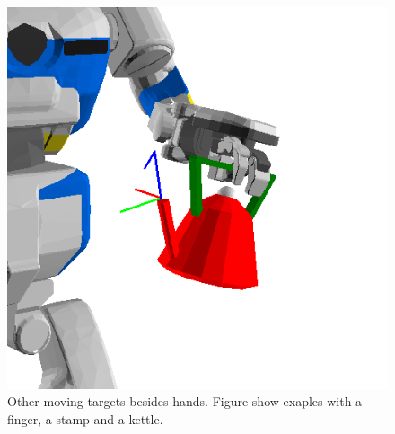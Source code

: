 \begin{figure}[htbp]
\begin{center}
\begin{minipage}{0.30\hsize}
\begin{center}
     \end{center}
   \end{minipage}
   \begin{minipage}{0.30\hsize}
     \begin{center}
       \includegraphics[clip, width=1.0\columnwidth]{figs/kettle-move-target.png}
     \end{center}
   \end{minipage}
  \caption{\small{Other moving targets besides hands. Figure show exaples with a finger, a stamp and a kettle.}}
  \label{figure:move_target}
 \end{center}
 \vspace{-8mm}
\end{figure}

